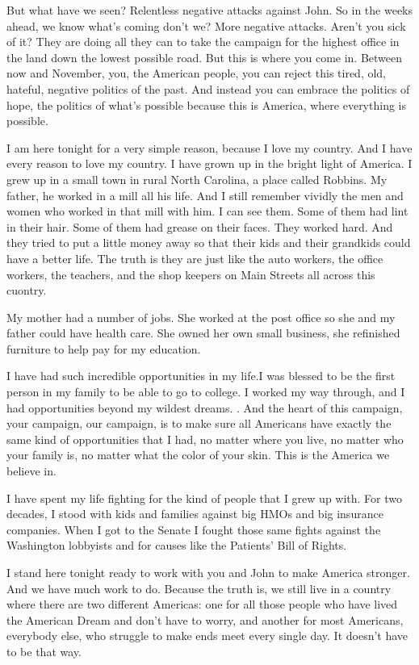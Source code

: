 But what have we seen? Relentless negative attacks against John. So in
the weeks ahead, we know what's coming don't we? More negative attacks.
Aren't you sick of it? They are doing all they can to take the campaign
for the highest office in the land down the lowest possible road. But
this is where you come in. Between now and November, you, the American
people, you can reject this tired, old, hateful, negative politics of
the past. And instead you can embrace the politics of hope, the politics
of what's possible because this is America, where everything is
possible.

I am here tonight for a very simple reason, because I love my country.
And I have every reason to love my country. I have grown up in the
bright light of America. I grew up in a small town in rural North
Carolina, a place called Robbins. My father, he worked in a mill all his
life. And I still remember vividly the men and women who worked in that
mill with him. I can see them. Some of them had lint in their hair. Some
of them had grease on their faces. They worked hard. And they tried to
put a little money away so that their kids and their grandkids could
have a better life. The truth is they are just like the auto workers,
the office workers, the teachers, and the shop keepers on Main Streets
all across this cuontry.

My mother had a number of jobs. She worked at the post office so she and
my father could have health care. She owned her own small business, she
refinished furniture to help pay for my education.

I have had such incredible opportunities in my life.I was blessed to be
the first person in my family to be able to go to college. I worked my
way through, and I had opportunities beyond my wildest dreams. . And the
heart of this campaign, your campaign, our campaign, is to make sure all
Americans have exactly the same kind of opportunities that I had, no
matter where you live, no matter who your family is, no matter what the
color of your skin. This is the America we believe in.

I have spent my life fighting for the kind of people that I grew up
with. For two decades, I stood with kids and families against big HMOs
and big insurance companies. When I got to the Senate I fought those
same fights against the Washington lobbyists and for causes like the
Patients' Bill of Rights.

I stand here tonight ready to work with you and John to make America
stronger. And we have much work to do. Because the truth is, we still
live in a country where there are two different Americas: one for all
those people who have lived the American Dream and don't have to worry,
and another for most Americans, everybody else, who struggle to make
ends meet every single day. It doesn't have to be that way.

